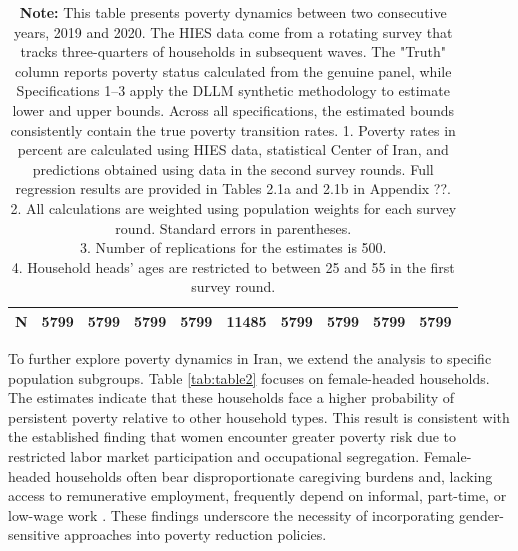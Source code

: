 \documentclass[12pt,a4paper]{article}
\begin{document}
\begin{table}[H]
\begin{tabular}{lccccccccc}
        N
        & 5799 & 5799 & 5799 & 5799 & 11485 & 5799 & 5799 & 5799 & 5799 \\
        \bottomrule
    \end{tabular}
    \caption*{ \footnotesize \textbf{Note:}  This table presents poverty dynamics between two consecutive years, 2019 and 2020. The HIES data come from a rotating survey that tracks three-quarters of households in subsequent waves. The "Truth" column reports poverty status calculated from the genuine panel, while Specifications 1–3 apply the DLLM synthetic methodology to estimate lower and upper bounds. Across all specifications, the estimated bounds consistently contain the true poverty transition rates.  1. Poverty rates in percent are calculated using HIES data, statistical Center of Iran, and predictions obtained using data in the second survey rounds.
Full regression results are provided in Tables 2.1a and 2.1b in Appendix ??. \\
2. All calculations are weighted using population weights for each survey round. Standard errors in parentheses.\\
3. Number of replications for the estimates is 500.\\
4. Household heads' ages are restricted to between 25 and 55 in the first survey round.}
\end{table}
To further explore poverty dynamics in Iran, we extend the analysis to specific population subgroups. Table \autoref{tab:table2} focuses on female-headed households. The estimates indicate that these households face a higher probability of persistent poverty relative to other household types. This result is consistent with the established finding that women encounter greater poverty risk due to restricted labor market participation and occupational segregation. Female-headed households often bear disproportionate caregiving burdens and, lacking access to remunerative employment, frequently depend on informal, part-time, or low-wage work \citep{yoosefi2020challenges}. These findings underscore the necessity of incorporating gender-sensitive approaches into poverty reduction policies.
\end{document}
